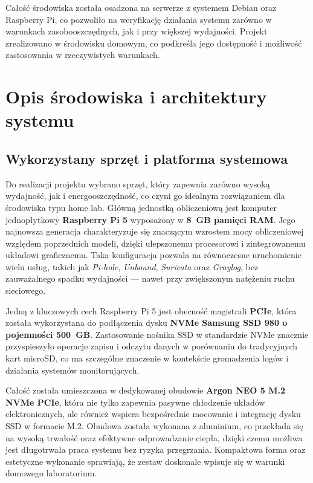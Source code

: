 \documentclass[
    left=2.5cm,         %
    right=2.5cm,        %
    top=2.5cm,          %
    bottom=3cm,         %
    bindingoffset=6mm,  %
    nohyphenation=true %
]{eiti/eiti-thesis} %
\begin{document}
Całość środowiska została osadzona na serwerze z systemem Debian oraz Raspberry Pi, co pozwoliło na weryfikację działania systemu zarówno w warunkach zasobooszczędnych, jak i przy większej wydajności. Projekt zrealizowano w środowisku domowym, co podkreśla jego dostępność i możliwość zastosowania w rzeczywistych warunkach.

\newpage 
\section{Opis środowiska i architektury systemu}
\subsection{Wykorzystany sprzęt i platforma systemowa}

Do realizacji projektu wybrano sprzęt, który zapewnia zarówno wysoką wydajność, jak i energooszczędność, co czyni go idealnym rozwiązaniem dla środowiska typu home lab. Główną jednostką obliczeniową jest komputer jednopłytkowy \textbf{Raspberry Pi 5}\cite{raspberry-start} wyposażony w \textbf{8~GB pamięci RAM}. Jego najnowsza generacja charakteryzuje się znaczącym wzrostem mocy obliczeniowej względem poprzednich modeli, dzięki ulepszonemu procesorowi i zintegrowanemu układowi graficznemu. Taka konfiguracja pozwala na równoczesne uruchomienie wielu usług, takich jak \textit{Pi-hole}, \textit{Unbound}, \textit{Suricata} oraz \textit{Graylog}, bez zauważalnego spadku wydajności — nawet przy zwiększonym natężeniu ruchu sieciowego.

Jedną z kluczowych cech Raspberry Pi 5 jest obecność magistrali \textbf{PCIe}, która została wykorzystana do podłączenia dysku \textbf{NVMe Samsung SSD 980 o pojemności 500~GB}. Zastosowanie nośnika SSD w standardzie NVMe znacznie przyspieszyło operacje zapisu i odczytu danych w porównaniu do tradycyjnych kart microSD, co ma szczególne znaczenie w kontekście gromadzenia logów i działania systemów monitorujących.

Całość została umieszczona w dedykowanej obudowie \textbf{Argon NEO 5 M.2 NVMe PCIe}, która nie tylko zapewnia pasywne chłodzenie układów elektronicznych, ale również wspiera bezpośrednie mocowanie i integrację dysku SSD w formacie M.2. Obudowa została wykonana z aluminium, co przekłada się na wysoką trwałość oraz efektywne odprowadzanie ciepła, dzięki czemu możliwa jest długotrwała praca systemu bez ryzyka przegrzania. Kompaktowa forma oraz estetyczne wykonanie sprawiają, że zestaw doskonale wpisuje się w warunki domowego laboratorium.
\end{document}
